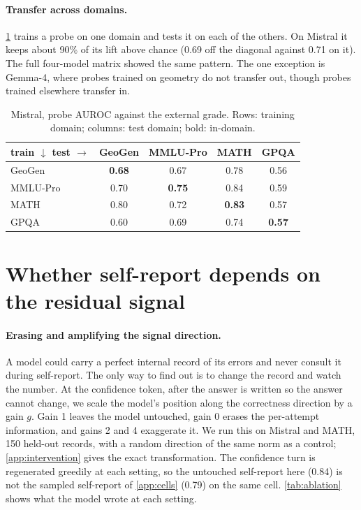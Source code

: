 \documentclass{article}
\begin{document}
\paragraph{Transfer across domains.}
\cref{tab:transfer} trains a probe on one domain and tests it on each of the others.
On Mistral it keeps about 90\% of its lift above chance (0.69 off the diagonal against 0.71 on it).
The full four-model matrix showed the same pattern.
The one exception is Gemma-4, where probes trained on geometry do not transfer out, though probes trained elsewhere transfer in.

\begin{table}[t]
\caption{Mistral, probe AUROC against the external grade. Rows: training domain; columns: test domain; bold: in-domain.}
\label{tab:transfer}
\centering
\small
\begin{tabular}{lcccc}
\toprule
\textbf{train $\downarrow$ test $\rightarrow$} & \textbf{GeoGen} & \textbf{MMLU-Pro} & \textbf{MATH} & \textbf{GPQA} \\
\midrule
GeoGen & \textbf{0.68} & 0.67 & 0.78 & 0.56 \\
MMLU-Pro & 0.70 & \textbf{0.75} & 0.84 & 0.59 \\
MATH & 0.80 & 0.72 & \textbf{0.83} & 0.57 \\
GPQA & 0.60 & 0.69 & 0.74 & \textbf{0.57} \\
\bottomrule
\end{tabular}
\end{table}

\section{Whether self-report depends on the residual signal}
\label{sec:causal}

\paragraph{Erasing and amplifying the signal direction.}
A model could carry a perfect internal record of its errors and never consult it during self-report.
The only way to find out is to change the record and watch the number.
At the confidence token, after the answer is written so the answer cannot change, we scale the model's position along the correctness direction by a gain $g$.
Gain 1 leaves the model untouched, gain 0 erases the per-attempt information, and gains 2 and 4 exaggerate it.
We run this on Mistral and MATH, 150 held-out records, with a random direction of the same norm as a control; \cref{app:intervention} gives the exact transformation.
The confidence turn is regenerated greedily at each setting, so the untouched self-report here (0.84) is not the sampled self-report of \cref{app:cells} (0.79) on the same cell.
\cref{tab:ablation} shows what the model wrote at each setting.
\end{document}
